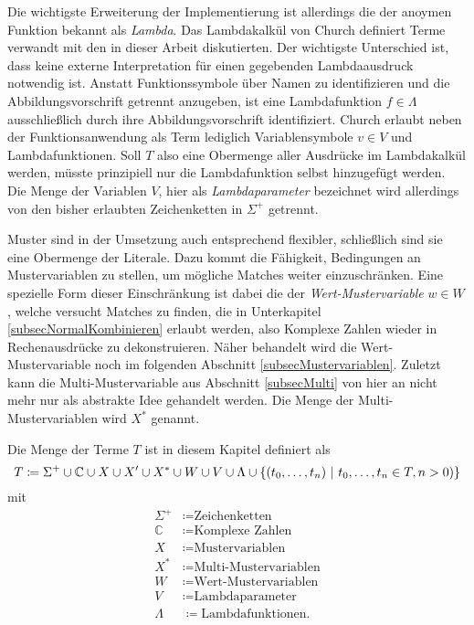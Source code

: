 Die wichtigste Erweiterung der Implementierung ist allerdings die der anoymen Funktion bekannt als \emph{Lambda}. Das Lambdakalkül von Church \cite{ChurchLambda36} definiert Terme verwandt mit den in dieser Arbeit diskutierten. Der wichtigste Unterschied ist, dass keine externe Interpretation für einen gegebenden Lambdaausdruck notwendig ist. Anstatt Funktionssymbole über Namen zu identifizieren und die Abbildungsvorschrift getrennt anzugeben, ist eine Lambdafunktion $f \in \Lambda$ ausschließlich durch ihre Abbildungsvorschrift identifiziert. Church erlaubt neben der Funktionsanwendung als Term lediglich Variablensymbole  $v \in V$ und Lambdafunktionen. Soll $T$ also eine Obermenge aller Ausdrücke im Lambdakalkül werden, müsste prinzipiell nur die Lambdafunktion selbst hinzugefügt werden. Die Menge der Variablen $V$, hier als \emph{Lambdaparameter} bezeichnet wird allerdings von den bisher erlaubten Zeichenketten in $\Sigma^+$ getrennt.

Muster sind in der Umsetzung auch entsprechend flexibler, schließlich sind sie eine Obermenge der Literale. Dazu kommt die Fähigkeit, Bedingungen an Mustervariablen zu stellen, um mögliche Matches weiter einzuschränken. Eine spezielle Form dieser Einschränkung ist dabei die der \emph{Wert-Mustervariable} $w \in W$, welche versucht Matches zu finden, die in Unterkapitel \ref{subsecNormalKombinieren} erlaubt werden, also Komplexe Zahlen wieder in Rechenausdrücke zu dekonstruieren. Näher behandelt wird die Wert-Mustervariable noch im folgenden Abschnitt \ref{subsecMustervariablen}. 
Zuletzt kann die Multi-Mustervariable aus Abschnitt \ref{subsecMulti} von hier an nicht mehr nur als abstrakte Idee gehandelt werden. Die Menge der Multi-Mustervariablen wird $X^*$ genannt. 

\begin{definition} \label{defKnotentypenMathe}
Die Menge der Terme $T$ ist in diesem Kapitel definiert als
$$T \coloneqq \Sigma^+ \cup \mathbb C \cup X \cup X' \cup X^* \cup W \cup V \cup \Lambda \cup \curl*{(\elems t 0 n)~|~ \elems t 0 n \in T, n > 0)}$$
mit
\begin{align*}
    \Sigma^+  &\coloneqq \text{Zeichenketten}\\
    \mathbb C &\coloneqq \text{Komplexe Zahlen}\\
    X         &\coloneqq \text{Mustervariablen}\\
    X^*       &\coloneqq \text{Multi-Mustervariablen}\\
    W         &\coloneqq \text{Wert-Mustervariablen}\\
    V         &\coloneqq \text{Lambdaparameter}\\
    \Lambda   &\coloneqq \text{Lambdafunktionen}.
\end{align*}
\end{definition}




